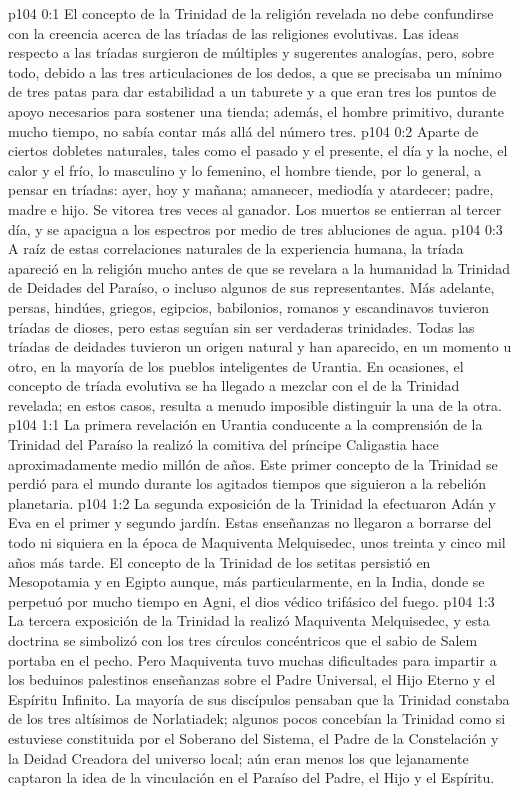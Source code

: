 \author{Melquisedec}
\vs p104 0:1 El concepto de la Trinidad de la religión revelada no debe confundirse con la creencia acerca de las tríadas de las religiones evolutivas. Las ideas respecto a las tríadas surgieron de múltiples y sugerentes analogías, pero, sobre todo, debido a las tres articulaciones de los dedos, a que se precisaba un mínimo de tres patas para dar estabilidad a un taburete y a que eran tres los puntos de apoyo necesarios para sostener una tienda; además, el hombre primitivo, durante mucho tiempo, no sabía contar más allá del número tres.
\vs p104 0:2 Aparte de ciertos dobletes naturales, tales como el pasado y el presente, el día y la noche, el calor y el frío, lo masculino y lo femenino, el hombre tiende, por lo general, a pensar en tríadas: ayer, hoy y mañana; amanecer, mediodía y atardecer; padre, madre e hijo. Se vitorea tres veces al ganador. Los muertos se entierran al tercer día, y se apacigua a los espectros por medio de tres abluciones de agua.
\vs p104 0:3 A raíz de estas correlaciones naturales de la experiencia humana, la tríada apareció en la religión mucho antes de que se revelara a la humanidad la Trinidad de Deidades del Paraíso, o incluso algunos de sus representantes. Más adelante, persas, hindúes, griegos, egipcios, babilonios, romanos y escandinavos tuvieron tríadas de dioses, pero estas seguían sin ser verdaderas trinidades. Todas las tríadas de deidades tuvieron un origen natural y han aparecido, en un momento u otro, en la mayoría de los pueblos inteligentes de Urantia. En ocasiones, el concepto de tríada evolutiva se ha llegado a mezclar con el de la Trinidad revelada; en estos casos, resulta a menudo imposible distinguir la una de la otra.
\vs p104 1:1 La primera revelación en Urantia conducente a la comprensión de la Trinidad del Paraíso la realizó la comitiva del príncipe Caligastia hace aproximadamente medio millón de años. Este primer concepto de la Trinidad se perdió para el mundo durante los agitados tiempos que siguieron a la rebelión planetaria.
\vs p104 1:2 La segunda exposición de la Trinidad la efectuaron Adán y Eva en el primer y segundo jardín. Estas enseñanzas no llegaron a borrarse del todo ni siquiera en la época de Maquiventa Melquisedec, unos treinta y cinco mil años más tarde. El concepto de la Trinidad de los setitas persistió en Mesopotamia y en Egipto aunque, más particularmente, en la India, donde se perpetuó por mucho tiempo en Agni, el dios védico trifásico del fuego.
\vs p104 1:3 La tercera exposición de la Trinidad la realizó Maquiventa Melquisedec, y esta doctrina se simbolizó con los tres círculos concéntricos que el sabio de Salem portaba en el pecho. Pero Maquiventa tuvo muchas dificultades para impartir a los beduinos palestinos enseñanzas sobre el Padre Universal, el Hijo Eterno y el Espíritu Infinito. La mayoría de sus discípulos pensaban que la Trinidad constaba de los tres altísimos de Norlatiadek; algunos pocos concebían la Trinidad como si estuviese constituida por el Soberano del Sistema, el Padre de la Constelación y la Deidad Creadora del universo local; aún eran menos los que lejanamente captaron la idea de la vinculación en el Paraíso del Padre, el Hijo y el Espíritu.
